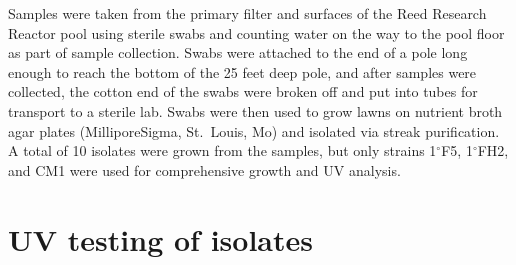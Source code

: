 \documentclass[12pt,twoside]{reedthesis}
\begin{document}
Samples were taken from the primary filter and surfaces of the Reed Research Reactor pool using sterile swabs and counting water on the way to the pool floor as part of sample collection. Swabs were attached to the end of a pole long enough to reach the bottom of the 25 feet deep pole, and after samples were collected, the cotton end of the swabs were broken off and put into tubes for transport to a sterile lab. Swabs were then used to grow lawns on nutrient broth agar plates (MilliporeSigma, St.~Louis, Mo) and isolated via streak purification. A total of 10 isolates were grown from the samples, but only strains 1\(^{\circ}\)F5, 1\(^{\circ}\)FH2, and CM1 were used for comprehensive growth and UV analysis.

\hypertarget{uv-testing-of-isolates}{%
\section{UV testing of isolates}\label{uv-testing-of-isolates}}
\end{document}
